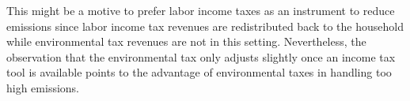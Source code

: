 This might be a motive to prefer labor income taxes as an instrument to reduce emissions since labor income tax revenues are redistributed back to the household while environmental tax revenues are not in this setting. Nevertheless, the observation that the environmental tax only adjusts slightly once an income tax tool is available points to the advantage of environmental taxes in handling too high emissions. 



